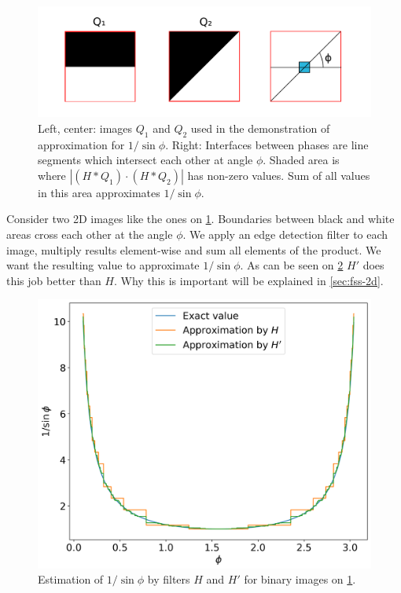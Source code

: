 \documentclass[1p]{elsarticle}
\begin{document}
\begin{figure}
  \centering
  \includegraphics[width=0.8\linewidth]{images/experiment-setup.png}
  \caption[]{Left, center: images $Q_1$ and $Q_2$ used in the demonstration of
    approximation for $1 / \sin \phi$. Right: Interfaces between phases are
    line segments which intersect each other at angle $\phi$. Shaded area is
    where $|(H*Q_1)\cdot(H*Q_2)|$ has non-zero values. Sum of all values in this
    area approximates $1 / \sin \phi$.}
  \label{fig:experiment-setup}
\end{figure}
Consider two 2D images like the ones on \cref{fig:experiment-setup}. Boundaries
between black and white areas cross each other at the angle $\phi$. We apply an
edge detection filter to each image, multiply results element-wise and sum all
elements of the product. We want the resulting value to approximate
$1/\sin \phi$. As can be seen on \cref{fig:filter-comparison} $H'$ does this job
better than $H$. Why this is important will be explained in \cref{sec:fss-2d}.
\begin{figure}
  \centering
  \includegraphics[width=0.8\linewidth]{images/filter-comparison.png}
  \caption[]{Estimation of $1/\sin\phi$ by filters $H$ and $H'$ for binary
    images on \cref{fig:experiment-setup}.}
  \label{fig:filter-comparison}
\end{figure}
\end{document}
